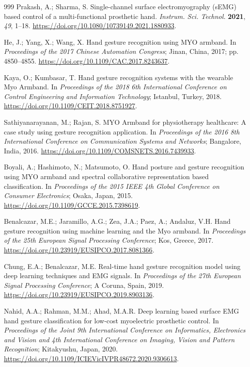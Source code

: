 \documentclass[technologies,article,submit,pdftex,moreauthors]{Definitions/mdpi}
\begin{document}
\begin{thebibliography}{999}
Prakash, A.; Sharma, S. Single-channel surface electromyography (sEMG) based control of a multi-functional prosthetic hand. \textit{Instrum. Sci. Technol.} \textbf{2021}, \textit{49}, 1--18. \url{https://doi.org/10.1080/10739149.2021.1880933}.

He, J.; Yang, X.; Wang, X. Hand gesture recognition using MYO armband. In \textit{Proceedings of the 2017 Chinese Automation Congress}; Jinan, China, 2017; pp. 4850--4855. \url{https://doi.org/10.1109/CAC.2017.8243637}.

Kaya, O.; Kumbasar, T. Hand gesture recognition systems with the wearable Myo Armband. In \textit{Proceedings of the 2018 6th International Conference on Control Engineering and Information Technology}; Istanbul, Turkey, 2018. \url{https://doi.org/10.1109/CEIT.2018.8751927}.

Sathiyanarayanan, M.; Rajan, S. MYO Armband for physiotherapy healthcare: A case study using gesture recognition application. In \textit{Proceedings of the 2016 8th International Conference on Communication Systems and Networks}; Bangalore, India, 2016. \url{https://doi.org/10.1109/COMSNETS.2016.7439933}.

Boyali, A.; Hashimoto, N.; Matsumoto, O. Hand posture and gesture recognition using MYO armband and spectral collaborative representation based classification. In \textit{Proceedings of the 2015 IEEE 4th Global Conference on Consumer Electronics}; Osaka, Japan, 2015. \url{https://doi.org/10.1109/GCCE.2015.7398619}.

Benalcazar, M.E.; Jaramillo, A.G.; Zea, J.A.; Paez, A.; Andaluz, V.H. Hand gesture recognition using machine learning and the Myo armband. In \textit{Proceedings of the 25th European Signal Processing Conference}; Kos, Greece, 2017. \url{https://doi.org/10.23919/EUSIPCO.2017.8081366}.

Chung, E.A.; Benalcazar, M.E. Real-time hand gesture recognition model using deep learning techniques and EMG signals. In \textit{Proceedings of the 27th European Signal Processing Conference}; A Coruna, Spain, 2019. \url{https://doi.org/10.23919/EUSIPCO.2019.8903136}.

Nahid, A.A.; Rahman, M.M.; Ahad, M.A.R. Deep learning based surface EMG hand gesture classification for low-cost myoelectric prosthetic control. In \textit{Proceedings of the Joint 9th International Conference on Informatics, Electronics and Vision and 4th International Conference on Imaging, Vision and Pattern Recognition}; Kitakyushu, Japan, 2020. \url{https://doi.org/10.1109/ICIEVicIVPR48672.2020.9306613}.


\end{thebibliography}
\end{document}
